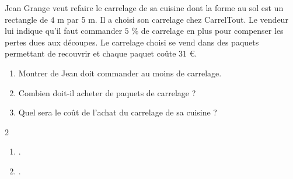 \begin{exercice*}[Carrelage]
    Jean Grange veut refaire le carrelage de sa cuisine dont la forme au sol est un 
    rectangle de $4$ m par $5$ m. Il a choisi son carrelage chez CarrelTout. Le vendeur
    lui indique qu'il faut commander $5$ \% de carrelage en plus pour compenser les
    pertes dues aux découpes. Le carrelage choisi se vend dans des paquets permettant de 
    recouvrir  et chaque paquet coûte $31$ \euro.    
    \begin{enumerate}
        \item Montrer de Jean doit commander au moins  de carrelage.
        \item Combien doit-il acheter de paquets de carrelage ?
        \item Quel sera le coût de l'achat du carrelage de sa cuisine ?    
    \end{enumerate}
\end{exercice*}
\begin{corrige}
    \phantom{rrr}    
    \begin{multicols}2
        \begin{enumerate}
            \item .
            \item .
        \end{enumerate}
    \end{multicols}
\end{corrige}

